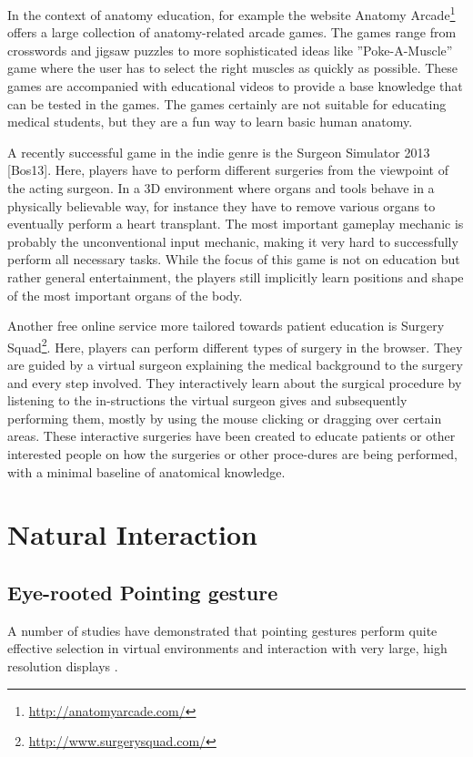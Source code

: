In the context of anatomy education, for example the website Anatomy Arcade\footnote{\url{http://anatomyarcade.com/}} offers a large collection of anatomy-related arcade games. The games range from crosswords and jigsaw puzzles to more sophisticated ideas like ”Poke-A-Muscle” game where the user has to select the right muscles as quickly as possible. These games are accompanied with educational videos to provide a base knowledge that can be tested in the games. The games certainly are not suitable for educating medical students, but they are a fun way to learn basic human anatomy.

A recently successful game in the indie genre is the Surgeon Simulator 2013 [Bos13]. Here, players have to perform different surgeries from the viewpoint of the acting surgeon. In a 3D environment where organs and tools behave in a physically believable way, for instance they have to remove various organs to eventually perform a heart transplant. The most important gameplay mechanic is probably the unconventional input mechanic, making it very hard to successfully perform all necessary tasks. While the focus of this game is not on education but rather general entertainment, the players still implicitly learn positions and shape of the most important organs of the body.

Another free online service more tailored towards patient education is Surgery Squad\footnote{\url{http://www.surgerysquad.com/}}. Here, players can perform different types of surgery in the browser. They are guided by a virtual surgeon explaining the medical background to the surgery and every step involved. They interactively learn about the surgical procedure by listening to the in-structions the virtual surgeon gives and subsequently performing them, mostly by using the mouse clicking or dragging over certain areas. These interactive surgeries have been created to educate patients or other interested people on how the surgeries or other proce-dures are being performed, with a minimal baseline of anatomical knowledge.

\section{Natural Interaction}

\subsection{Eye-rooted Pointing gesture}
A number of studies have demonstrated that pointing gestures perform quite effective selection in virtual environments \citep{Argelaguet2008} and interaction with very large, high resolution displays \citep{Vogel2005}.

